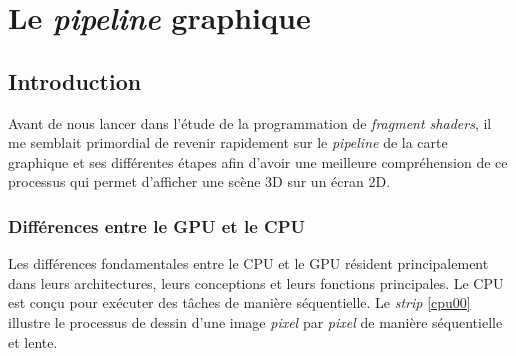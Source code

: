 \chapter{Le \textit{pipeline} graphique}

\section{Introduction}
Avant de nous lancer dans l'étude de la programmation de \textit{fragment shaders}, il me semblait primordial de revenir rapidement sur le \textit{pipeline} de la carte graphique et ses différentes étapes afin d'avoir une meilleure compréhension de ce processus qui permet d'afficher une scène 3D sur un écran 2D.

\subsection*{Différences entre le GPU et le CPU}
Les différences fondamentales entre le CPU et le GPU résident principalement dans leurs architectures, leurs conceptions et leurs fonctions principales. Le CPU est conçu pour exécuter des tâches de manière séquentielle. Le \textit{strip} \ref{cpu00} illustre le processus de dessin d'une image \textit{pixel} par \textit{pixel} de manière séquentielle et lente. 

